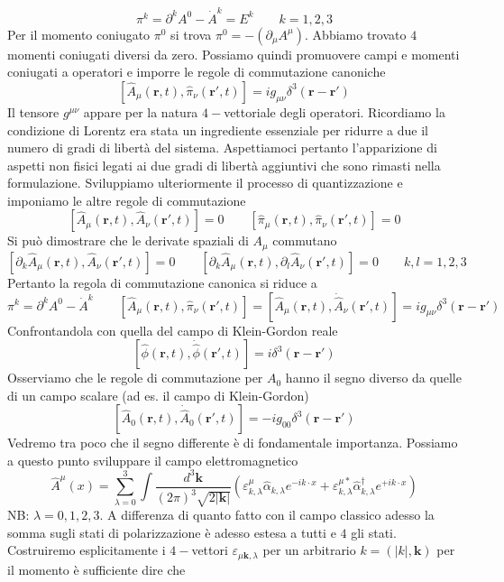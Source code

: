$$
\pi^k = \partial^k A^0 - \dot{A}^k = E^k \qquad k = 1,2,3
$$
Per il momento coniugato $\pi^0$ si trova $\pi^0=-\left(\partial_\mu A^\mu\right)$. Abbiamo trovato $4$ momenti coniugati diversi da zero. Possiamo quindi promuovere campi e momenti coniugati a operatori e imporre le regole di commutazione canoniche
$$
[\hat{A}_\mu(\mathbf{r}, t), \hat{\pi}_\nu(\mathbf{r}', t)] = i g_{\mu\nu} \delta^3(\mathbf{r} - \mathbf{r}')
$$
Il tensore $g^{\mu\nu}$ appare per la natura $4-$vettoriale degli operatori. Ricordiamo la condizione di Lorentz era stata un ingrediente essenziale per ridurre a due il numero di gradi di libertà del sistema. Aspettiamoci pertanto l'apparizione di aspetti non fisici legati ai due gradi di libertà aggiuntivi che sono rimasti nella formulazione. Sviluppiamo ulteriormente il processo di quantizzazione e imponiamo le altre regole di commutazione
$$
[\hat{A}_\mu(\mathbf{r}, t), \hat{A}_\nu(\mathbf{r}', t)] = 0 \qquad [\hat{\pi}_\mu(\mathbf{r}, t), \hat{\pi}_\nu(\mathbf{r}', t)] = 0
$$
Si può dimostrare che le derivate spaziali di $A_\mu$ commutano
$$
[\partial_k \hat{A}_\mu(\mathbf{r}, t), \hat{A}_\nu(\mathbf{r}', t)] = 0 \qquad [\partial_k \hat{A}_\mu(\mathbf{r}, t), \partial_l \hat{A}_\nu(\mathbf{r}', t)] = 0 \qquad k, l = 1, 2, 3
$$
Pertanto la regola di commutazione canonica si riduce a
$$
\pi^k = \partial^k A^0 - \dot{A}^k \qquad [\hat{A}_\mu(\mathbf{r}, t), \hat{\pi}_\nu(\mathbf{r}', t)] = [\hat{A}_\mu(\mathbf{r}, t), \dot{\hat{A}}_\nu(\mathbf{r}', t)] = i g_{\mu\nu} \delta^3(\mathbf{r} - \mathbf{r}')
$$
Confrontandola con quella del campo di Klein-Gordon reale
$$
[\hat{\phi}(\mathbf{r}, t), \dot{\hat{\phi}}(\mathbf{r}', t)] = i \delta^3(\mathbf{r} - \mathbf{r}')
$$
Osserviamo che le regole di commutazione per $A_0$ hanno il segno diverso da quelle di un campo scalare (ad es. il campo di Klein-Gordon)
$$
[\hat{A}_0(\mathbf{r}, t), \dot{\hat{A}}_0(\mathbf{r}', t)] = -i g_{00} \delta^3(\mathbf{r} - \mathbf{r}')
$$
Vedremo tra poco che il segno differente è di fondamentale importanza. Possiamo a questo punto sviluppare il campo elettromagnetico
$$
\hat{A}^\mu(x) = \sum_{\lambda=0}^3 \int \frac{d^3\mathbf{k}}{(2\pi)^3 \sqrt{2|\mathbf{k}|}} \left( \varepsilon^\mu_{k,\lambda} \hat{\alpha}_{k,\lambda} e^{-ik\cdot x} + \varepsilon^{\mu *}_{k,\lambda} \hat{\alpha}_{k,\lambda}^\dagger e^{+ik\cdot x} \right)
$$
NB: $\lambda=0,1,2,3$. A differenza di quanto fatto con il campo classico adesso la somma sugli stati di polarizzazione è adesso estesa a tutti e $4$ gli stati. Costruiremo esplicitamente i $4-$vettori $\varepsilon_{\mu\mathbf{k},\lambda}$ per un arbitrario $k=(|k|, \mathbf{k})$ per il momento è sufficiente dire che
